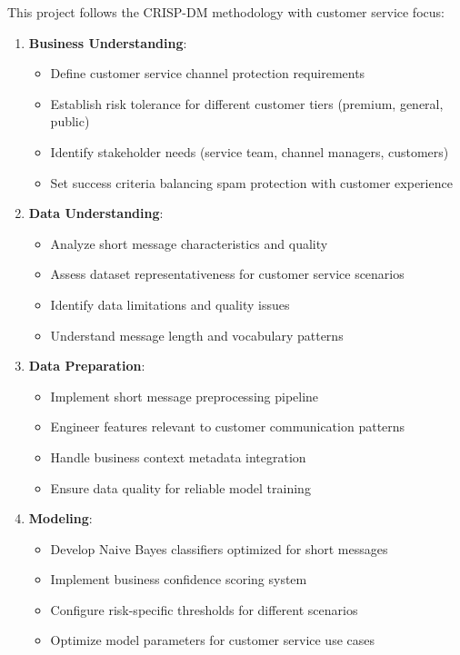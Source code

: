 \documentclass[12pt,a4paper]{article}
\begin{document}
This project follows the CRISP-DM methodology with customer service focus:

\begin{enumerate}
    \item \textbf{Business Understanding}: 
    \begin{itemize}
        \item Define customer service channel protection requirements
        \item Establish risk tolerance for different customer tiers (premium, general, public)
        \item Identify stakeholder needs (service team, channel managers, customers)
        \item Set success criteria balancing spam protection with customer experience
    \end{itemize}
    
    \item \textbf{Data Understanding}: 
    \begin{itemize}
        \item Analyze short message characteristics and quality
        \item Assess dataset representativeness for customer service scenarios
        \item Identify data limitations and quality issues
        \item Understand message length and vocabulary patterns
    \end{itemize}
    
    \item \textbf{Data Preparation}: 
    \begin{itemize}
        \item Implement short message preprocessing pipeline
        \item Engineer features relevant to customer communication patterns
        \item Handle business context metadata integration
        \item Ensure data quality for reliable model training
    \end{itemize}
    
    \item \textbf{Modeling}: 
    \begin{itemize}
        \item Develop Naive Bayes classifiers optimized for short messages
        \item Implement business confidence scoring system
        \item Configure risk-specific thresholds for different scenarios
        \item Optimize model parameters for customer service use cases
    \end{itemize}
    

\end{enumerate}
\end{document}
